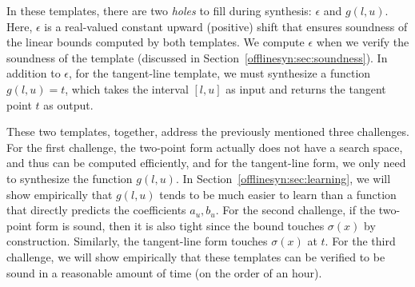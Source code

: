 In these templates, there are two \emph{holes} to fill during synthesis:
$ \epsilon $ and $ g(l, u) $. Here, $\epsilon $
is a real-valued constant upward (positive) shift that ensures soundness of the
linear bounds computed by both templates.
%
We compute $ \epsilon $ when we verify the soundness of the template (discussed
in Section~\ref{offlinesyn:sec:soundness}).
%
In addition to $\epsilon$, for the
tangent-line template, we must synthesize a function $ g(l, u) = t$, which
takes the interval $ [l, u] $ as input and returns the tangent point $ t $ as output.
%

These two templates, together, address the previously mentioned three challenges. For the
first challenge, the two-point form actually does not have a search space, and thus can be computed efficiently, and
for the tangent-line form, we only need to synthesize the function $g(l,u)$. In
Section~\ref{offlinesyn:sec:learning}, we will show empirically that $ g(l, u) $
tends to be
much easier to learn than a function that directly predicts the coefficients $
a_u, b_u $.
%
For the second
challenge, if the two-point form is sound, then it is also tight since the
bound touches $ \sigma(x) $ by construction. Similarly, the tangent-line form
touches $ \sigma(x) $ at $ t $.
%
For the third challenge, we will show empirically that these templates can be
verified to be sound in a reasonable amount of time (on the order of an hour).

